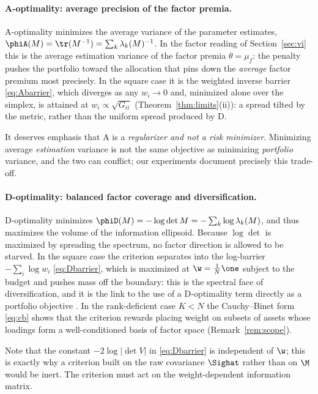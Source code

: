 \paragraph{A-optimality: average precision of the factor premia.}
A-optimality minimizes the average variance of the parameter estimates,
$\phiA(M)=\tr(M^{-1})=\sum_{k}\lambda_k(M)^{-1}$. In the factor reading of
Section~\ref{sec:vi} this is the average estimation variance of the factor
premia $\theta=\mu_f$: the penalty pushes the portfolio toward the allocation
that pins down the \emph{average} factor premium most precisely. In the square
case it is the weighted inverse barrier \eqref{eq:Abarrier}, which diverges as
any $w_i\to0$ and, minimized alone over the simplex, is attained at
$w_i\propto\sqrt{G_{ii}}$ (Theorem~\ref{thm:limits}(ii)): a spread tilted by the
metric, rather than the uniform spread produced by D.

It deserves emphasis that A is a \emph{regularizer and not a risk minimizer}.
Minimizing average \emph{estimation} variance is not the same objective as
minimizing \emph{portfolio} variance, and the two can conflict; our experiments
document precisely this trade-off.

\paragraph{D-optimality: balanced factor coverage and diversification.}
D-optimality minimizes $\phiD(M)=-\log\det M=-\sum_k\log\lambda_k(M)$, and thus
maximizes the volume of the information ellipsoid. Because $\log\det$ is
maximized by spreading the spectrum, no factor direction is allowed to be
starved. In the square case the criterion separates into the log-barrier
$-\sum_i\log w_i$ \eqref{eq:Dbarrier}, which is maximized at $\w=\tfrac1N\one$
subject to the budget and pushes mass off the boundary: this is the spectral face
of diversification, and it is the link to the use of a D-optimality term directly
as a portfolio objective \cite{depaula2022}. In the rank-deficient case
$K<N$ the Cauchy--Binet form \eqref{eq:cb} shows that the criterion rewards
placing weight on subsets of assets whose loadings form a well-conditioned basis
of factor space (Remark~\ref{rem:scope}).

Note that the constant $-2\log|\det V|$ in \eqref{eq:Dbarrier} is independent of
$\w$; this is exactly why a criterion built on the raw covariance $\Sighat$
rather than on $\M$ would be inert. The criterion must act on the
weight-dependent information matrix.

